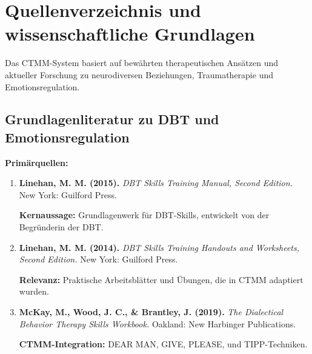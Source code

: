 
\section{Quellenverzeichnis und wissenschaftliche Grundlagen}
\label{sec:bibliography}

\begin{ctmmBlueBox}[title=Wissenschaftliche Fundierung des CTMM-Systems]

Das CTMM-System basiert auf bewährten therapeutischen Ansätzen und aktueller Forschung zu neurodiversen Beziehungen, Traumatherapie und Emotionsregulation.

\end{ctmmBlueBox}

\subsection{Grundlagenliteratur zu DBT und Emotionsregulation}

\begin{ctmmGreenBox}[title=Dialektisch-Behaviorale Therapie (DBT)]

\textbf{Primärquellen:}
\begin{enumerate}
    \item \textbf{Linehan, M. M. (2015).} \textit{DBT Skills Training Manual, Second Edition.} New York: Guilford Press. 
    
    \textbf{Kernaussage:} Grundlagenwerk für DBT-Skills, entwickelt von der Begründerin der DBT.
    
    \item \textbf{Linehan, M. M. (2014).} \textit{DBT Skills Training Handouts and Worksheets, Second Edition.} New York: Guilford Press.
    
    \textbf{Relevanz:} Praktische Arbeitsblätter und Übungen, die in CTMM adaptiert wurden.
    
    \item \textbf{McKay, M., Wood, J. C., \& Brantley, J. (2019).} \textit{The Dialectical Behavior Therapy Skills Workbook.} Oakland: New Harbinger Publications.
    
    \textbf{CTMM-Integration:} DEAR MAN, GIVE, PLEASE, und TIPP-Techniken.
\end{enumerate}

\end{ctmmGreenBox}

